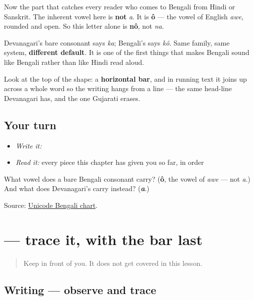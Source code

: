 Now the part that catches every reader who comes to Bengali from Hindi or Sanskrit. The inherent vowel here is \textbf{not} \emph{a}. It is \textbf{ô} — the vowel of English \emph{awe}, rounded and open. So this letter alone is \textbf{nô}, not \emph{na}.

Devanagari's bare consonant says \emph{ka}; Bengali's says \emph{kô}. Same family, same system, \textbf{different default}. It is one of the first things that makes Bengali sound like Bengali rather than like Hindi read aloud.

Look at the top of the shape: a \textbf{horizontal bar}, and in running text it joins up across a whole word so the writing hangs from a line — the same head-line Devanagari has, and the one Gujarati erases.

\subsection*{Your turn}
\begin{itemize}
\raggedright
  \item \emph{Write it:} 
  \item \emph{Read it:} every piece this chapter has given you so far, in order
\end{itemize}

\begin{tcolorbox}[breakable,colback=teal!4,colframe=teal!35!black,title={Before you move on}]
What vowel does a bare Bengali consonant carry? (\textbf{ô}, the vowel of \emph{awe} — not \emph{a}.) And what does Devanagari's carry instead? (\emph{\textbf{a}}.)

Source: \href{https://www.unicode.org/charts/PDF/U0980.pdf}{Unicode Bengali chart}.
\end{tcolorbox}
\section[\texorpdfstring{\bn{ন} (nô)}{ন (nô)}]{ — trace it, with the bar last}

\label{lesson:BN-W01-na-trace}



\begin{quote}
Keep \textbf{} in front of you. It does not get covered in this lesson.
\end{quote}

\subsection*{Writing — observe and trace}

